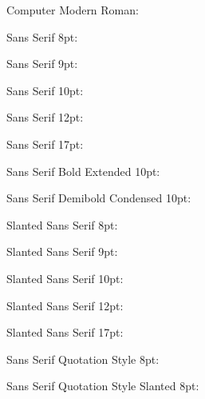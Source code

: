 \documentclass[10pt,a4paper]{article}
\newcommand{\Ligature}{%

}
\begin{document}
Computer Modern Roman:\\{\Ligature}

Sans Serif 8pt:\\{\olsseight \Ligature}

Sans Serif 9pt:\\{\olssnine \Ligature}

Sans Serif 10pt:\\{\olssten \Ligature}

Sans Serif 12pt:\\{\olsstwelve \Ligature}

Sans Serif 17pt:\\{\olssseventeen \Ligature}

Sans Serif Bold Extended 10pt:\\{\olssbx \Ligature}

Sans Serif Demibold Condensed 10pt:\\{\olssdc \Ligature}

Slanted Sans Serif 8pt:\\{\olssieight \Ligature}

Slanted Sans Serif 9pt:\\{\olssinine \Ligature}

Slanted Sans Serif 10pt:\\{\olssiten \Ligature}

Slanted Sans Serif 12pt:\\{\olssitwelve \Ligature}

Slanted Sans Serif 17pt:\\{\olssiseventeen \Ligature}

Sans Serif Quotation Style 8pt:\\{\olssq \Ligature}

Sans Serif Quotation Style Slanted 8pt:\\{\olssqi \Ligature}
\end{document}
